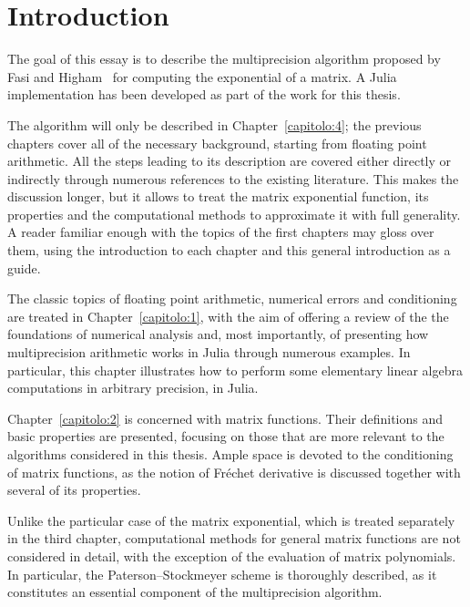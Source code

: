 \chapter*{Introduction}
The goal of this essay is to describe the multiprecision algorithm proposed by Fasi and Higham~\cite{higham:hf19_mpexpm} for computing the exponential of a matrix. A Julia implementation has been developed as part of the work for this thesis.

The algorithm will only be described in Chapter~\ref{capitolo:4}; the previous chapters cover all of the necessary background, starting from floating point arithmetic. All the steps leading to its description are covered either directly or indirectly through numerous references to the existing literature. This makes the discussion longer, but it allows to treat the matrix exponential function, its properties and the computational methods to approximate it with full generality.
A reader familiar enough with the topics of the first chapters may gloss over them, using the introduction to each chapter and this general introduction as a guide.
\smallskip 

The classic topics of floating point arithmetic, numerical errors and conditioning are treated in Chapter~\ref{capitolo:1}, with the aim of offering a review of the the foundations of numerical analysis and, most importantly, of presenting how multiprecision arithmetic works in Julia through numerous examples. In particular, this chapter illustrates how to perform some elementary linear algebra computations in arbitrary precision, in Julia. 
\smallskip 

Chapter~\ref{capitolo:2} is concerned with matrix functions. Their definitions and basic properties are presented, focusing on those that are more relevant to the algorithms considered in this thesis. Ample space is devoted to the conditioning of matrix functions, as the notion of Fréchet derivative is discussed together with several of its properties. 

Unlike the particular case of the matrix exponential, which is treated separately in the third chapter, computational methods for general matrix functions are not considered in detail, with the exception of the evaluation of matrix polynomials. In particular, the Paterson--Stockmeyer scheme is thoroughly described, as it constitutes an essential component of the multiprecision algorithm.
\smallskip 

